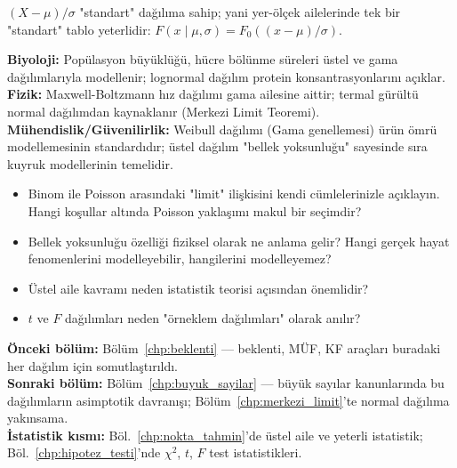 \begin{onerme}[Standartlaştırma]
$(X - \mu)/\sigma$ "standart" dağılıma sahip; yani yer-ölçek ailelerinde
tek bir "standart" tablo yeterlidir: $F(x \mid \mu, \sigma) = F_0((x-\mu)/\sigma)$.
\end{onerme}

\begin{kopru}
\textbf{Biyoloji:} Popülasyon büyüklüğü, hücre bölünme süreleri üstel ve gama
dağılımlarıyla modellenir; lognormal dağılım protein konsantrasyonlarını açıklar.\\
\textbf{Fizik:} Maxwell-Boltzmann hız dağılımı gama ailesine aittir;
termal gürültü normal dağılımdan kaynaklanır (Merkezi Limit Teoremi).\\
\textbf{Mühendislik/Güvenilirlik:} Weibull dağılımı (Gama genellemesi)
ürün ömrü modellemesinin standardıdır; üstel dağılım "bellek yoksunluğu"
sayesinde sıra kuyruk modellerinin temelidir.
\end{kopru}

\begin{ozyansima}
\begin{itemize}
  \item Binom ile Poisson arasındaki "limit" ilişkisini kendi cümlelerinizle açıklayın.
        Hangi koşullar altında Poisson yaklaşımı makul bir seçimdir?
  \item Bellek yoksunluğu özelliği fiziksel olarak ne anlama gelir?
        Hangi gerçek hayat fenomenlerini modelleyebilir, hangilerini modelleyemez?
  \item Üstel aile kavramı neden istatistik teorisi açısından önemlidir?
  \item $t$ ve $F$ dağılımları neden "örneklem dağılımları" olarak anılır?
\end{itemize}
\end{ozyansima}

\begin{kopru}
\textbf{Önceki bölüm:} Bölüm~\ref{chp:beklenti} --- beklenti, MÜF, KF araçları
buradaki her dağılım için somutlaştırıldı.\\
\textbf{Sonraki bölüm:} Bölüm~\ref{chp:buyuk_sayilar} --- büyük sayılar kanunlarında
bu dağılımların asimptotik davranışı; Bölüm~\ref{chp:merkezi_limit}'te normal
dağılıma yakınsama.\\
\textbf{İstatistik kısmı:} Böl.~\ref{chp:nokta_tahmin}'de üstel aile ve yeterli
istatistik; Böl.~\ref{chp:hipotez_testi}'nde $\chi^2$, $t$, $F$ test istatistikleri.
\end{kopru}

